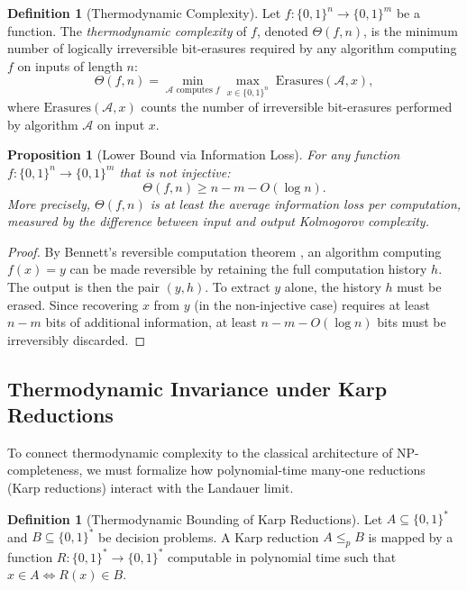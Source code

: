 \documentclass[12pt, a4paper]{article}
\theoremstyle{plain}
\newtheorem{proposition}[theorem]{Proposition}
\theoremstyle{definition}
\newtheorem{definition}[theorem]{Definition}
\theoremstyle{remark}
\begin{document}
\begin{definition}[Thermodynamic Complexity]\label{def:theta}
  Let $f: \{0,1\}^n \to \{0,1\}^m$ be a function. The \emph{thermodynamic
  complexity} of $f$, denoted $\Theta(f, n)$, is the minimum number of
  logically irreversible bit-erasures required by any algorithm computing
  $f$ on inputs of length $n$:
  \begin{equation}\label{eq:theta}
    \Theta(f, n) = \min_{\mathcal{A} \text{ computes } f}
    \max_{x \in \{0,1\}^n} \; \text{Erasures}(\mathcal{A}, x),
  \end{equation}
  where $\text{Erasures}(\mathcal{A}, x)$ counts the number of
  irreversible bit-erasures performed by algorithm $\mathcal{A}$ on
  input $x$.
\end{definition}

\begin{proposition}[Lower Bound via Information Loss]\label{prop:info_loss}
  For any function $f: \{0,1\}^n \to \{0,1\}^m$ that is not injective:
  \begin{equation}\label{eq:info_loss}
    \Theta(f, n) \geq n - m - O(\log n).
  \end{equation}
  More precisely, $\Theta(f, n)$ is at least the average information
  loss per computation, measured by the difference between input and
  output Kolmogorov complexity.
\end{proposition}

\begin{proof}
  By Bennett's reversible computation theorem \citep{Bennett1973}, an
  algorithm computing $f(x) = y$ can be made reversible by retaining
  the full computation history $h$. The output is then the pair $(y, h)$.
  To extract $y$ alone, the history $h$ must be erased. Since recovering
  $x$ from $y$ (in the non-injective case) requires at least $n - m$
  bits of additional information, at least $n - m - O(\log n)$ bits must
  be irreversibly discarded.
\end{proof}

\subsection{Thermodynamic Invariance under Karp Reductions}

To connect thermodynamic complexity to the classical architecture of NP-completeness, we must formalize how polynomial-time many-one reductions (Karp reductions) \citep{Karp1972} interact with the Landauer limit.

\begin{definition}[Thermodynamic Bounding of Karp Reductions]
  Let $A \subseteq \{0,1\}^*$ and $B \subseteq \{0,1\}^*$ be decision problems. A Karp reduction $A \leq_p B$ is mapped by a function $R: \{0,1\}^* \to \{0,1\}^*$ computable in polynomial time such that $x \in A \iff R(x) \in B$. 
\end{definition}
\end{document}
